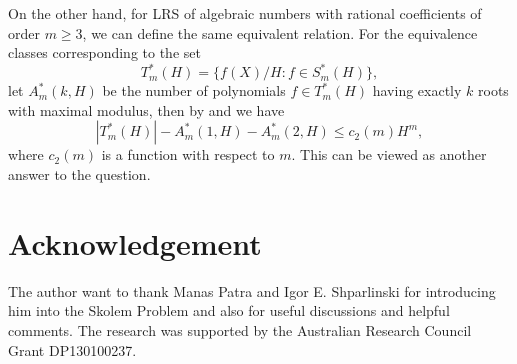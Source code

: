 \documentclass[12pt]{amsart}
\theoremstyle{definition}
\theoremstyle{remark}
\numberwithin{equation}{section}
\begin{document}
On the other hand, for LRS of algebraic numbers with rational coefficients of order $m\ge 3$, we can define the same equivalent relation. For the equivalence classes corresponding to the set 
$$
T_m^*(H)= \{f(X)/H: f\in S_m^*(H)\}, 
$$
let $A_m^*(k,H)$ be the number of polynomials $f\in T_m^*(H)$ having exactly $k$ roots with maximal modulus, then by \cite[Theorem 3.4]{DS3} and \cite[Theorem 1.4]{DS1} we have 
\begin{equation}
\label{eq:except2}
|T_m^*(H)| - A_m^*(1,H) - A_m^*(2,H)\le c_2(m) H^m, 
\end{equation} 
where $c_2(m)$ is a function with respect to $m$. 
This can be viewed as another answer to the question.

\section*{Acknowledgement}

The author want to thank Manas Patra and Igor E. Shparlinski for introducing him into the Skolem Problem and also for useful discussions and helpful comments.  
The research was supported by the Australian Research Council Grant DP130100237.
\end{document}
